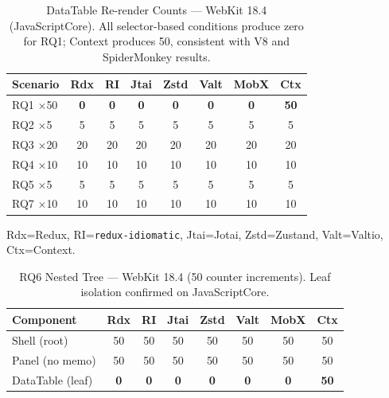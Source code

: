 \documentclass[conference]{IEEEtran}
\newcommand{\code}[1]{\texttt{\small #1}}
\begin{document}
\begin{table}[!ht]
\caption{DataTable Re-render Counts --- WebKit 18.4 (JavaScriptCore).
  All selector-based conditions produce zero for RQ1;
  Context produces 50, consistent with V8 and SpiderMonkey results.}
\label{tab:webkit-datatable}
\begin{center}
\scriptsize
\setlength{\tabcolsep}{2pt}
\begin{tabular}{lccccccc}
\toprule
\textbf{Scenario}
  & \textbf{Rdx} & \textbf{RI} & \textbf{Jtai}
  & \textbf{Zstd} & \textbf{Valt} & \textbf{MobX} & \textbf{Ctx} \\
\midrule
RQ1 $\times$50 & \textbf{0} & \textbf{0} & \textbf{0} & \textbf{0} & \textbf{0} & \textbf{0} & \textbf{50} \\
RQ2 $\times$5  & 5  & 5  & 5  & 5  & 5  & 5  & 5  \\
RQ3 $\times$20 & 20 & 20 & 20 & 20 & 20 & 20 & 20 \\
RQ4 $\times$10 & 10 & 10 & 10 & 10 & 10 & 10 & 10 \\
RQ5 $\times$5  & 5  & 5  & 5  & 5  & 5  & 5  & 5  \\
RQ7 $\times$10 & 10 & 10 & 10 & 10 & 10 & 10 & 10 \\
\bottomrule
\end{tabular}
\end{center}
\parbox{\columnwidth}{\scriptsize
  Rdx=Redux, RI=\code{redux-idiomatic}, Jtai=Jotai, Zstd=Zustand,
  Valt=Valtio, Ctx=Context.}
\end{table}

\begin{table}[!ht]
\caption{RQ6 Nested Tree --- WebKit 18.4 (50 counter increments).
  Leaf isolation confirmed on JavaScriptCore.}
\label{tab:webkit-rq6}
\begin{center}
\scriptsize
\setlength{\tabcolsep}{2pt}
\begin{tabular}{lccccccc}
\toprule
\textbf{Component}
  & \textbf{Rdx} & \textbf{RI} & \textbf{Jtai}
  & \textbf{Zstd} & \textbf{Valt} & \textbf{MobX} & \textbf{Ctx} \\
\midrule
Shell (root)     & 50 & 50 & 50 & 50 & 50 & 50 & 50 \\
Panel (no memo)  & 50 & 50 & 50 & 50 & 50 & 50 & 50 \\
DataTable (leaf) & \textbf{0} & \textbf{0} & \textbf{0} & \textbf{0}
                 & \textbf{0} & \textbf{0} & \textbf{50} \\
\bottomrule
\end{tabular}
\end{center}
\end{table}
\end{document}
